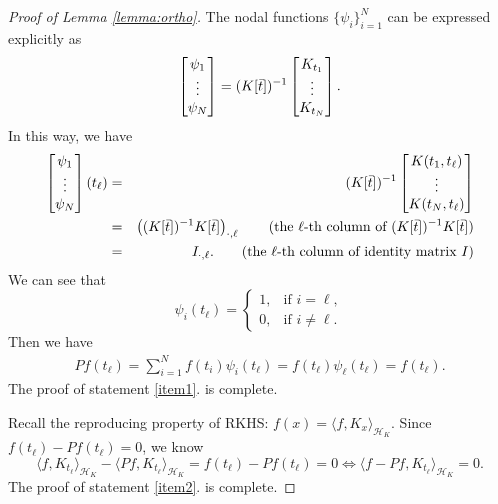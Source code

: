 \documentclass{article}
\numberwithin{equation}{section}
\begin{document}
\begin{proof}[Proof of Lemma \ref{lemma:ortho}]
   The nodal functions  $\{\psi_i\}_{i=1}^N$ can be expressed explicitly as 
\begin{equation}\label{psi}
       \begin{bmatrix}
           \psi_1\\
           \vdots\\
           \psi_N
       \end{bmatrix}= ( K[\Bar{t} ])^{-1} \begin{bmatrix}
           K_{t_1}\\
           \vdots\\
           K_{t_N}
       \end{bmatrix}. 
    \end{equation}
    In this way, we have
    \begin{eqnarray*}
       \begin{bmatrix}
           \psi_1\\
           \vdots\\
           \psi_N
       \end{bmatrix}(t_\ell) 
       &=& ( K[\Bar{t} ])^{-1} \begin{bmatrix}
           K(t_1,t_\ell)\\
           \vdots\\
            K(t_N,t_\ell)
       \end{bmatrix}\\
       &=&\left((K[\Bar{t} ])^{-1} K[\Bar{t} ]\right)_{\cdot , \ell}\qquad (\text{the $\ell$-th column of }(K[\Bar{t} ])^{-1} K[\Bar{t} ])\\
       &=&I_{\cdot , \ell}. \qquad (\text{the $\ell$-th column of identity matrix }I)
     \end{eqnarray*}
    We can see that 
    \begin{equation*}
    \psi_i(t_\ell) = \begin{cases}
      1, & \text{if } i=\ell,\\
      0, & \text{if } i \neq \ell.
    \end{cases}
\end{equation*}
Then we have
\begin{eqnarray*}
    Pf(t_\ell) = \sum_{i=1}^N f(t_i)\psi_i(t_\ell) = f(t_\ell)\psi_\ell(t_\ell) = f(t_\ell).
\end{eqnarray*}
The proof of statement \ref{item1}. is complete. 

Recall the reproducing property of RKHS:  $f(x) = \langle f, K_x \rangle_{\mathcal{H}_K}$. 
Since $f(t_\ell)- Pf(t_\ell) = 0$, we know 
\begin{equation*}
    \langle f,K_{t_\ell} \rangle_{\mathcal{H}_K} - \langle Pf,K_{t_\ell} \rangle_{\mathcal{H}_K}= f(t_\ell) - Pf(t_\ell) =0 \iff  \langle f-Pf,K_{t_\ell} \rangle_{\mathcal{H}_K}=0.
\end{equation*}
The proof of statement \ref{item2}. is complete. 
\end{proof}
\end{document}
